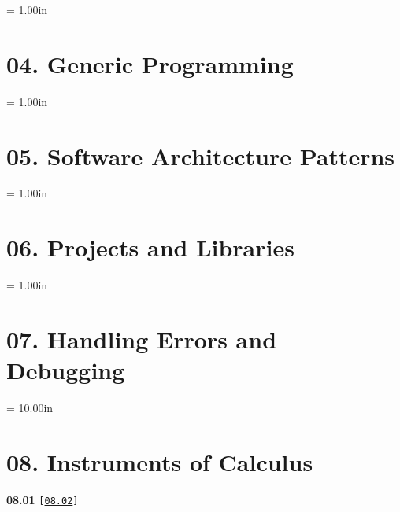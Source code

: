 \documentclass[a4paper,12pt]{article}
\begin{document}
\newpage\thispagestyle{empty}\pdfpageheight = 1.00in\enlargethispage{100in}

\section{04. Generic Programming}



\newpage\thispagestyle{empty}\pdfpageheight = 1.00in\enlargethispage{100in}

\section{05. Software Architecture Patterns}



\newpage\thispagestyle{empty}\pdfpageheight = 1.00in\enlargethispage{100in}

\section{06. Projects and Libraries}



\newpage\thispagestyle{empty}\pdfpageheight = 1.00in\enlargethispage{100in}

\section{07. Handling Errors and Debugging}



\newpage\thispagestyle{empty}\pdfpageheight = 10.00in\enlargethispage{100in}

\section{08. Instruments of Calculus}

{\large \textbf{08.01} \texttt{[\href{https://github.com/i-s-m-mipt/Education/blob/master/projects/examples/source/08.02.cpp}{\texttt{08.02}}]}}

\bigskip
\end{document}
